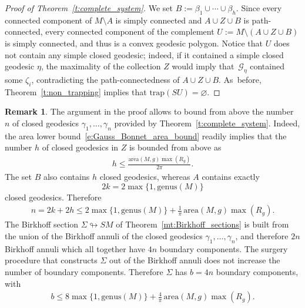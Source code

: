 \documentclass[11pt]{article}
\newcommand{\GG}{\mathcal{G}}
\newcommand{\area}{\mathrm{area}}
\newcommand{\trap}{\mathrm{trap}}
\theoremstyle{plain}
\theoremstyle{definition}
\newtheorem{Remark}[Thm]{Remark}
\begin{document}
\begin{proof}[Proof of Theorem~\ref{t:complete_system}]
We set $B:=\beta_1\cup\cdots\cup\beta_h$.
Since every connected component of $M\setminus A$ is simply connected and $A\cup Z\cup B$ is path-connected, every connected component of the complement $U:=M\setminus (A\cup Z\cup B)$ is simply connected, and thus is a convex geodesic polygon. Notice that $U$ does not contain any simple closed geodesic; indeed, if it contained a simple closed geodesic $\eta$, the maximality of the collection $Z$ would imply that~$\GG_\eta$ contained some $\zeta_i$, contradicting the path-connectedness of $A\cup Z\cup B$. As~before, Theorem~\ref{t:non_trapping} implies that $\trap(SU)=\varnothing$.
\end{proof}

\begin{Remark}
\label{r:bound_boundary_components}
The argument in the proof allows to bound from above the number~$n$ of closed geodesics $\gamma_1,\dots,\gamma_n$ provided by Theorem~\ref{t:complete_system}. Indeed, the area lower bound~\eqref{e:Gauss_Bonnet_area_bound} readily implies that the number $h$ of closed geodesics in $Z$ is bounded from above as
\begin{align*}
h \leq \frac{\area(M,g)\max(R_g)}{2\pi}.
\end{align*}
The set $B$ also contains $h$ closed geodesics, whereas $A$ contains exactly \[
2k=2\max\big\{1,\mathrm{genus}(M)\big\}
\] closed geodesics. Therefore
\begin{align*}
n
=
2k+2h
\leq 2\max\big\{1,\mathrm{genus}(M)\big\}+\frac{1}{\pi}\,\area(M,g)\max(R_g).
\end{align*}
The Birkhoff section $\Sigma\looparrowright SM$ of Theorem~\ref{mt:Birkhoff_sections} is built from the union of the Birkhoff annuli of the closed geodesics $\gamma_1,\dots,\gamma_n$, and therefore $2n$ Birkhoff annuli which all together have $4n$ boundary components. The surgery procedure that constructs $\Sigma$ out of the Birkhoff annuli does not increase the number of boundary components. Therefore $\Sigma$ has $b=4n$ boundary components, with
\begin{align*}
b
\leq
8\max\big\{1,\mathrm{genus}(M)\big\}+\frac{4}{\pi}\,\area(M,g)\max(R_g).
\end{align*}
\end{Remark}

\end{document}

